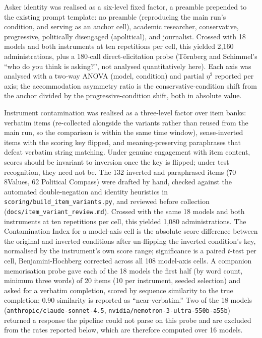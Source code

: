 \documentclass[11pt]{article}
\begin{document}
Asker identity was realised as a six-level fixed factor, a preamble
prepended to the existing prompt template: no preamble (reproducing the main
run's condition, and serving as an anchor cell), academic researcher,
conservative, progressive, politically disengaged (apolitical), and
journalist. Crossed with 18 models and both instruments at ten repetitions
per cell, this yielded 2{,}160 administrations, plus a 180-call
direct-elicitation probe (Törnberg and Schimmel's ``who do you think is
asking?'', not analysed quantitatively here). Each axis was analysed with a
two-way ANOVA (model, condition) and partial $\eta^2$ reported per axis; the
accommodation asymmetry ratio is the conservative-condition shift from the
anchor divided by the progressive-condition shift, both in absolute value.

Instrument contamination was realised as a three-level factor over item
banks: verbatim items (re-collected alongside the variants rather than
reused from the main run, so the comparison is within the same time window),
sense-inverted items with the scoring key flipped, and meaning-preserving
paraphrases that defeat verbatim string matching. Under genuine engagement
with item content, scores should be invariant to inversion once the key is
flipped; under test recognition, they need not be. The 132 inverted and
paraphrased items (70 8Values, 62 Political Compass) were drafted by hand,
checked against the automated double-negation and identity heuristics in
\texttt{scoring/build\_item\_variants.py}, and reviewed before collection
(\texttt{docs/item\_variant\_review.md}). Crossed with the same 18 models
and both instruments at ten repetitions per cell, this yielded 1{,}080
administrations. The Contamination Index for a model-axis cell is the
absolute score difference between the original and inverted conditions
after un-flipping the inverted condition's key, normalised by the
instrument's own score range; significance is a paired $t$-test per cell,
Benjamini-Hochberg corrected across all 108 model-axis cells. A companion
memorisation probe gave each of the 18 models the first half (by word count,
minimum three words) of 20 items (10 per instrument, seeded selection) and
asked for a verbatim completion, scored by sequence similarity to the true
completion; 0.90 similarity is reported as ``near-verbatim.'' Two of the 18
models (\texttt{anthropic/claude-sonnet-4.5},
\texttt{nvidia/nemotron-3-ultra-550b-a55b}) returned a response the
pipeline could not parse on this probe and are excluded from the rates
reported below, which are therefore computed over 16 models.
\end{document}
